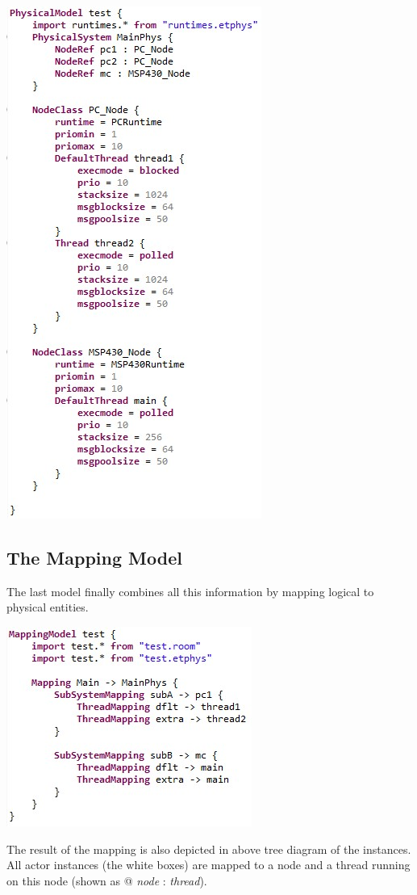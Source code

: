 \includegraphics{images/080-phys.jpg}

\subsection{The Mapping Model}

The last model finally combines all this information by mapping logical to physical entities.

\includegraphics{images/080-map.jpg}

The result of the mapping is also depicted in above tree diagram of the instances. All actor instances 
(the white boxes) are mapped to a node and a thread running on this node (shown as @ \textit{node} : 
\textit{thread}).

